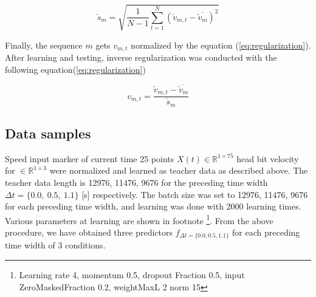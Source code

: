 \documentclass{sigchi}
\begin{document}
\begin{equation}
  \check{s}_m = \sqrt{ \frac{1}{N-1}\sum^{N}_{t=1} ( \check{v}_{m,t} - \overline{\check{v}_m} ) ^2} 			
\label{eq:standardDeviation}
\end{equation}

Finally, the sequence $ m $ gets $ v_{m, t} $ normalized by the equation (\ref{eq:regularization}).
After learning and testing, inverse regularization was conducted with the following equation(\ref{eq:regularization}) 

\begin{equation}
  v_{m,t} = \frac{\check{v}_{m,t} - \overline{\check{v}_{m}}}{\check{s}_m} 
  \label{eq:regularization}
\end{equation}


\subsection{Data samples}
Speed input marker of current time 25 points $ X (t) \in \mathbb {R} ^ {1 \times 75} $ head bit velocity for $ \in \mathbb {R}^{ 1 \times 3} $ were normalized and learned as teacher data as described above. The teacher data length is 12976, 11476, 9676 for the preceding time width $ \Delta t = \{0.0, \ 0.5, \ 1.1 \} $ [s] respectively. The batch size was set to 12976, 11476, 9676 for each preceding time width, and learning was done with 2000 learning times. Various parameters at learning are shown in footnote \footnote{Learning rate 4, momentum 0.5, dropout Fraction 0.5, input ZeroMaskedFraction 0.2, weightMaxL 2 norm 15}. From the above procedure, we have obtained three predictors $ f_{\Delta t = \{0.0, 0.5, 1.1 \}} $ for each preceding time width of 3 conditions.
\end{document}
